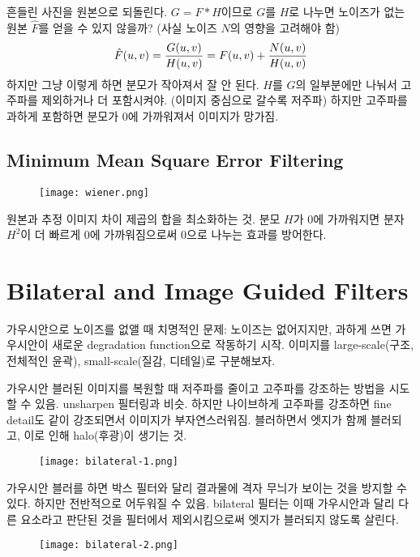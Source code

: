 흔들린 사진을 원본으로 되돌린다. $G = F \ast H$이므로 $G$를 $H$로 나누면 노이즈가 없는 원본 $\hat{F}$를 얻을 수 있지 않을까? (사실 노이즈 $N$의 영향을 고려해야 함)
$$\hat{F}(u, v) = {G(u, v) \over H(u, v)} = F(u, v) + {N(u, v) \over H(u, v)}$$
하지만 그냥 이렇게 하면 분모가 작아져서 잘 안 된다. $H$를 $G$의 일부분에만 나눠서 고주파를 제외하거나 더 포함시켜야. (이미지 중심으로 갈수록 저주파) 하지만 고주파를 과하게 포함하면 분모가 0에 가까워져서 이미지가 망가짐.

\subsection{Minimum Mean Square Error Filtering}

\begin{figure}[h]
  \centering
  \texttt{[image: wiener.png]}
\end{figure}

원본과 추정 이미지 차이 제곱의 합을 최소화하는 것. 분모 $H$가 0에 가까워지면 분자 $H^2$이 더 빠르게 0에 가까워짐으로써 0으로 나누는 효과를 방어한다.

\section{Bilateral and Image Guided Filters}

가우시안으로 노이즈를 없앨 때 치명적인 문제: 노이즈는 없어지지만, 과하게 쓰면 가우시안이 새로운 degradation function으로 작동하기 시작. 이미지를 large-scale(구조, 전체적인 윤곽), small-scale(질감, 디테일)로 구분해보자.

가우시안 블러된 이미지를 복원할 때 저주파를 줄이고 고주파를 강조하는 방법을 시도할 수 있음. unsharpen 필터링과 비슷. 하지만 나이브하게 고주파를 강조하면 fine detail도 같이 강조되면서 이미지가 부자연스러워짐. 블러하면서 엣지가 함께 블러되고, 이로 인해 halo(후광)이 생기는 것.

\begin{figure}[h]
  \centering
  \texttt{[image: bilateral-1.png]}
\end{figure}

가우시안 블러를 하면 박스 필터와 달리 결과물에 격자 무늬가 보이는 것을 방지할 수 있다. 하지만 전반적으로 어두워질 수 있음. bilateral 필터는 이때 가우시안과 달리 다른 요소라고 판단된 것을 필터에서 제외시킴으로써 엣지가 블러되지 않도록 살린다.

\begin{figure}[h]
  \centering
  \texttt{[image: bilateral-2.png]}
\end{figure}

